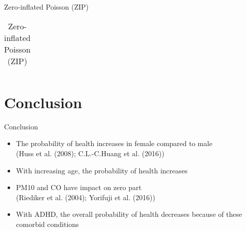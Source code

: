 \documentclass[aspectratio=169,xcolor=dvipsnames]{beamer}
\begin{document}
\begin{frame}{Zero-inflated Poisson (ZIP)}
\begin{center}
\begin{table}[h!]
{\begin{tabular}{clcccc}
						\bottomrule
					\end{tabular}
				}
				\caption{Zero-inflated Poisson (ZIP)}
			\end{table}
		\end{center}
		
	\end{frame}
	

	
	
	\section{Conclusion}
	\begin{frame}{Conclusion}
		\begin{itemize}
			\item \justifying The probability of health increases in female compared to male\\
			(Huss et al. (2008); C.L.-C.Huang et al. (2016))
			\item \justifying With increasing age, the probability of health increases\\
			\item \justifying PM10 and CO have impact on zero part\\ (Riediker et al. (2004); Yorifuji et al. (2016))	\\
			\item \justifying With ADHD, the overall probability of health decreases because of these comorbid conditions
		\end{itemize}

		
	\end{frame}
	
\end{document}

